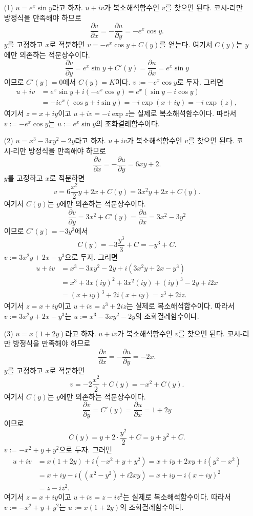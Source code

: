 \begin{itemize}
\item[(1)] $u=e^x\sin y$라고 하자. $u+iv$가 복소해석함수인 $v$를 찾으면 된다.
코시-리만 방정식을 만족해야 하므로
\[
\dfrac{\partial v}{\partial x} = - \dfrac{\partial u}{\partial y}= -e^x\cos y.
\]
$y$를 고정하고 $x$로 적분하면 $v=-e^x \cos y + C(y)$를 얻는다. 
여기서 $C(y)$는 $y$에만 의존하는 적분상수이다.
\[
\dfrac{\partial v}{\partial  y} = e^x\sin y + C'(y) 
= \dfrac{\partial u}{\partial x} = e^x \sin y
\]
이므로 $C'(y)=0$에서 $C(y)=K$이다.
$v:= -e^x \cos y$로 두자. 그러면
\begin{align*}
u+iv &= e^x\sin y + i(-e^x\cos y) = e^x (\sin y - i\cos y) \\
&= -ie^x(\cos y +i\sin y) = -i \exp(x+iy) = -i\exp(z),
\end{align*}
여기서 $z=x+iy$이고
$u+iv = -i\exp z$는 실제로 복소해석함수이다.
따라서 $v:=-e^x\cos y$는 $u:=e^x\sin y$의 조화결레함수이다.

\item[(2)] $u= x^3-3xy^2-2y$라고 하자. $u+iv$가 복소해석함수인 $v$를 찾으면 된다.
코시-리만 방정식을 만족해야 하므로
\[
\dfrac{\partial v}{\partial x} = - \dfrac{\partial u}{\partial y}= 6xy+2.
\]
$y$를 고정하고 $x$로 적분하면 
\[
v = 6\dfrac{x^2}{2}y + 2x + C(y) = 3x^2y +2x+ C(y).
\]
여기서 $C(y)$는 $y$에만 의존하는 적분상수이다.
\[
\dfrac{\partial v}{\partial  y} = 3x^2 + C'(y) 
= \dfrac{\partial u}{\partial x} = 3x^2 - 3y^2
\]
이므로 $C'(y)=-3y^2$에서 
\[
 C(y) = -3\dfrac{y^3}{3} + C  = -y^3+C.
\]
$v:= 3x^2y+2x-y^3$으로 두자. 그러면
\begin{align*}
u+iv &= x^3-3xy^2 -2y +i(3x^2y + 2x-y^3) \\  
&= x^3 +3x(iy)^2 + 3x^2(iy) +(iy)^3 -2y +i2x \\
&= (x+iy)^3 + 2i(x+iy) = z^3+2iz.
\end{align*}
여기서 $z=x+iy$이고
$u+iv =z^3+2iz$는 실제로 복소해석함수이다.
따라서 $v:=3x^2y+2x-y^3$는 $u:=x^3-3xy^2-2y$의 조화결레함수이다.

\item[(3)] $u= x(1+2y)$라고 하자. $u+iv$가 복소해석함수인 $v$를 찾으면 된다.
코시-리만 방정식을 만족해야 하므로
\[
\dfrac{\partial v}{\partial x} = - \dfrac{\partial u}{\partial y}= -2x.
\]
$y$를 고정하고 $x$로 적분하면 
\[
v = - 2\dfrac{x^2}{2} + C(y) = -x^2 + C(y).
\]
여기서 $C(y)$는 $y$에만 의존하는 적분상수이다.
\[
\dfrac{\partial v}{\partial  y} =  C'(y) 
= \dfrac{\partial u}{\partial x} = 1+2y
\]
이므로
\[
 C(y) = y + 2\cdot \dfrac{y^2}2 + C = y + y^2 + C.
\]
$v:= -x^2+y+y^2$으로 두자. 그러면
\begin{align*}
u+iv &= x(1+2y) + i(-x^2+y+y^2) = x+iy + 2xy + i(y^2-x^2) \\
&= x + iy -i( (x^2-y^ 2) +i2xy ) = x+ iy -i(x+iy)^2 \\
&=  z- iz^2.
\end{align*}
여기서 $z=x+iy$이고
$u+iv =z-iz^2$는 실제로 복소해석함수이다.
따라서 $v:=-x^2 + y+y^2$는 $u:=x(1+2y)$의 조화결레함수이다.

\end{itemize}

